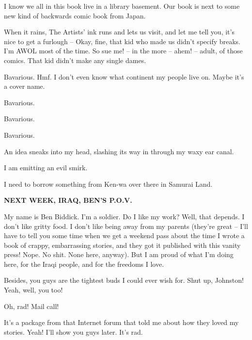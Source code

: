 I know we all in this book live in a library basement. Our book is
next to some new kind of backwards comic book from Japan.



When it rains, The Artists' ink runs and lets us visit, and let me
tell you, it's nice to get a furlough -- Okay, fine, that kid who
made us didn't specify breaks. I'm AWOL most of the time. So sue
me! -- in the more -- ahem! -- adult, of those comics. That kid
didn't make any single dames.



Bavarious. Hmf. I don't even know what continent my people live on.
Maybe it's a cover name.



Bavarious.



Bavarious.



Bavarious.



An idea sneaks into my head, slashing its way in through my waxy
ear canal.



I am emitting an evil smirk.



I need to borrow something from Ken-wa over there in Samurai
Land.



{\bf NEXT WEEK, IRAQ, BEN'S P.O.V.}



My name is Ben Biddick. I'm a soldier. Do I like my work? Well,
that depends. I don't like gritty food. I don't like being away
from my parents (they're great -- I'll have to tell you some time
when we get a weekend pass about the time I wrote a book of crappy,
embarrassing stories, and they got it published with this vanity
press! Nope. No shit. None here, anyway). But I am proud of what
I'm doing here, for the Iraqi people, and for the freedoms I
love.



Besides, you guys are the tightest buds I could ever wish for. Shut
up, Johnston! Yeah, well, you too!



Oh, rad! Mail call!



It's a package from that Internet forum that told me about how they
loved my stories. Yeah! I'll show you guys later. It's rad.



